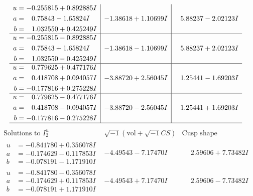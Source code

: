 \documentclass[1p]{elsarticle_modified}
\theoremstyle{definition}
\newcommand{\I}{\sqrt{-1}}
\begin{document}
$$\begin{array}{c|c|c}
\begin{aligned}
u &= -0.255815 + 0.892885 I \\
a &= \phantom{-}0.75843 - 1.65824 I \\
b &= \phantom{-}1.032550 + 0.425249 I\end{aligned}
 & -1.38618 + 1.10699 I & \phantom{-}5.88237 - 2.02123 I \\ \hline\begin{aligned}
u &= -0.255815 - 0.892885 I \\
a &= \phantom{-}0.75843 + 1.65824 I \\
b &= \phantom{-}1.032550 - 0.425249 I\end{aligned}
 & -1.38618 - 1.10699 I & \phantom{-}5.88237 + 2.02123 I \\ \hline\begin{aligned}
u &= \phantom{-}0.779625 + 0.477176 I \\
a &= \phantom{-}0.418708 + 0.094057 I \\
b &= -0.177816 + 0.275228 I\end{aligned}
 & -3.88720 + 2.56045 I & \phantom{-}1.25441 - 1.69203 I \\ \hline\begin{aligned}
u &= \phantom{-}0.779625 - 0.477176 I \\
a &= \phantom{-}0.418708 - 0.094057 I \\
b &= -0.177816 - 0.275228 I\end{aligned}
 & -3.88720 - 2.56045 I & \phantom{-}1.25441 + 1.69203 I\\
 \hline 
 \end{array}$$\newpage$$\begin{array}{c|c|c}  
\text{Solutions to }I^u_{2}& \I (\text{vol} + \sqrt{-1}CS) & \text{Cusp shape}\\
 \hline 
\begin{aligned}
u &= -0.841780 + 0.356078 I \\
a &= -0.174629 - 0.117853 I \\
b &= -0.078191 - 1.171910 I\end{aligned}
 & -4.49543 - 7.17470 I & \phantom{-}2.59606 + 7.73482 I \\ \hline\begin{aligned}
u &= -0.841780 - 0.356078 I \\
a &= -0.174629 + 0.117853 I \\
b &= -0.078191 + 1.171910 I\end{aligned}
 & -4.49543 + 7.17470 I & \phantom{-}2.59606 - 7.73482 I \\ \hline\begin{aligned}

\end{aligned}
\end{array}$$
\end{document}
